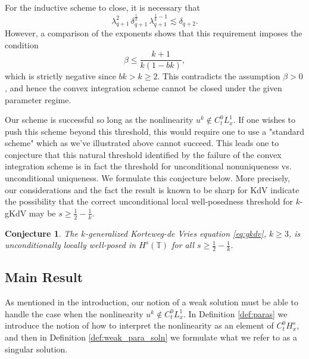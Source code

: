 \documentclass[12pt,reqno,letterpaper]{amsart}
\numberwithin{equation}{section}
\newcommand{\1}{{\bf 1}}
\newcommand{\2}{{\bf 2}}
\newcommand{\T}{\mathbb T}
\newtheorem{conjecture}[theorem]{Conjecture}
\theoremstyle{remark}
\theoremstyle{remark}
\begin{document}
For the inductive scheme to close, it is necessary that
\[
\lambda_{q+1}^2 \, \delta_{q+1}^{\frac{1}{k}} \, \lambda_{q+1}^{\frac{1}{k}-1}
\lesssim \delta_{q+2}.
\]
However, a comparison of the exponents shows that this requirement imposes the condition
\[
\beta \leq \frac{k+1}{k(1-bk)},
\]
which is strictly negative since $bk > k \geq 2$. This contradicts the assumption $\beta>0$, and hence the convex integration scheme cannot be closed under the given parameter regime.

Our scheme is successful so long as the nonlinearity $u^k \not \in C_t^0L^1_x$. If one wishes to push this scheme beyond this threshold, this would require one to use a "standard scheme" which as we've illustrated above cannot succeed. This leads one to conjecture that this natural threshold identified by the failure of the convex integration scheme is in fact the threshold for unconditional nonuniqueness vs. unconditional uniqueness. We formulate this conjecture below. More precisely, our considerations and the fact the result is known to be sharp for \textsf{KdV} indicate the possibility that the correct unconditional local well-posedness threshold for $k$-\textsf{gKdV} may be $s \geq \frac{1}{2} - \frac{1}{k}$.

\begin{conjecture}
    The $k$-generalized Korteweg-de Vries equation \eqref{eq:gkdv}, $k \geq 3$, is unconditionally locally well-posed in $H^s(\T)$ for all $s \geq \frac{1}{2} - \frac{1}{k}$.
\end{conjecture}




\subsection{Main Result}

As mentioned in the introduction, our notion of a weak solution must be able to handle the case when the nonlinearity $u^k \not \in C_t^0 L^1_x$. In Definition \ref{def:paras} we introduce the notion of how to interpret the nonlinearity as an element of $C_t^0 H_x^s$, and then in Definition \ref{def:weak_para_soln} we formulate what we refer to as a singular solution.
\end{document}
